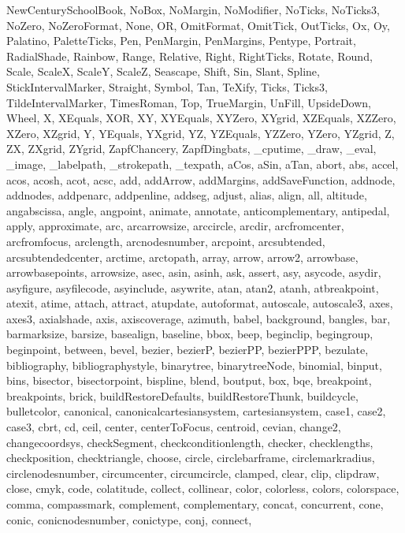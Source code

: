 {{  NewCenturySchoolBook, NoBox, NoMargin, NoModifier, NoTicks, NoTicks3, NoZero,
  NoZeroFormat, None, OR, OmitFormat, OmitTick, OutTicks, Ox, Oy, Palatino,
  PaletteTicks, Pen, PenMargin, PenMargins, Pentype, Portrait, RadialShade,
  Rainbow, Range, Relative, Right, RightTicks, Rotate, Round, Scale, ScaleX,
  ScaleY, ScaleZ, Seascape, Shift, Sin, Slant, Spline, StickIntervalMarker,
  Straight, Symbol, Tan, TeXify, Ticks, Ticks3, TildeIntervalMarker,
  TimesRoman, Top, TrueMargin, UnFill, UpsideDown, Wheel, X, XEquals, XOR, XY,
  XYEquals, XYZero, XYgrid, XZEquals, XZZero, XZero, XZgrid, Y, YEquals,
  YXgrid, YZ, YZEquals, YZZero, YZero, YZgrid, Z, ZX, ZXgrid, ZYgrid,
  ZapfChancery, ZapfDingbats, _cputime, _draw, _eval, _image, _labelpath,
  _strokepath, _texpath, aCos, aSin, aTan, abort, abs, accel, acos, acosh,
  acot, acsc, add, addArrow, addMargins, addSaveFunction, addnode, addnodes,
  addpenarc, addpenline, addseg, adjust, alias, align, all, altitude,
  angabscissa, angle, angpoint, animate, annotate, anticomplementary,
  antipedal, apply, approximate, arc, arcarrowsize, arccircle, arcdir,
  arcfromcenter, arcfromfocus, arclength, arcnodesnumber, arcpoint,
  arcsubtended, arcsubtendedcenter, arctime, arctopath, array, arrow, arrow2,
  arrowbase, arrowbasepoints, arrowsize, asec, asin, asinh, ask, assert, asy,
  asycode, asydir, asyfigure, asyfilecode, asyinclude, asywrite, atan, atan2,
  atanh, atbreakpoint, atexit, atime, attach, attract, atupdate, autoformat,
  autoscale, autoscale3, axes, axes3, axialshade, axis, axiscoverage, azimuth,
  babel, background, bangles, bar, barmarksize, barsize, basealign, baseline,
  bbox, beep, beginclip, begingroup, beginpoint, between, bevel, bezier,
  bezierP, bezierPP, bezierPPP, bezulate, bibliography, bibliographystyle,
  binarytree, binarytreeNode, binomial, binput, bins, bisector, bisectorpoint,
  bispline, blend, boutput, box, bqe, breakpoint, breakpoints, brick,
  buildRestoreDefaults, buildRestoreThunk, buildcycle, bulletcolor, canonical,
  canonicalcartesiansystem, cartesiansystem, case1, case2, case3, cbrt, cd,
  ceil, center, centerToFocus, centroid, cevian, change2, changecoordsys,
  checkSegment, checkconditionlength, checker, checklengths, checkposition,
  checktriangle, choose, circle, circlebarframe, circlemarkradius,
  circlenodesnumber, circumcenter, circumcircle, clamped, clear, clip,
  clipdraw, close, cmyk, code, colatitude, collect, collinear, color,
  colorless, colors, colorspace, comma, compassmark, complement, complementary,
  concat, concurrent, cone, conic, conicnodesnumber, conictype, conj, connect,
}}
